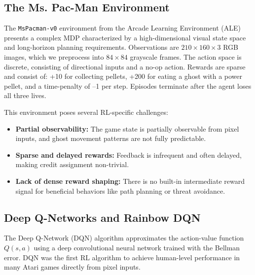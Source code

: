 \documentclass{article}
\begin{document}
\subsection{The Ms. Pac-Man Environment}

The \texttt{MsPacman-v0} environment from the Arcade Learning Environment (ALE) \cite{ale} presents a complex MDP characterized by a high-dimensional visual state space and long-horizon planning requirements. Observations are $210 \times 160 \times 3$ RGB images, which we preprocess into $84 \times 84$ grayscale frames. The action space is discrete, consisting of directional inputs and a no-op action. Rewards are sparse and consist of: +10 for collecting pellets, +200 for eating a ghost with a power pellet, and a time-penalty of –1 per step. Episodes terminate after the agent loses all three lives.

This environment poses several RL-specific challenges:
\begin{itemize}
    \item \textbf{Partial observability:} The game state is partially observable from pixel inputs, and ghost movement patterns are not fully predictable.
    \item \textbf{Sparse and delayed rewards:} Feedback is infrequent and often delayed, making credit assignment non-trivial.
    \item \textbf{Lack of dense reward shaping:} There is no built-in intermediate reward signal for beneficial behaviors like path planning or threat avoidance.
\end{itemize}

\subsection{Deep Q-Networks and Rainbow DQN}

The Deep Q-Network (DQN) algorithm \cite{mnih2015human} approximates the action-value function $Q(s, a)$ using a deep convolutional neural network trained with the Bellman error. DQN was the first RL algorithm to achieve human-level performance in many Atari games directly from pixel inputs.
\end{document}
